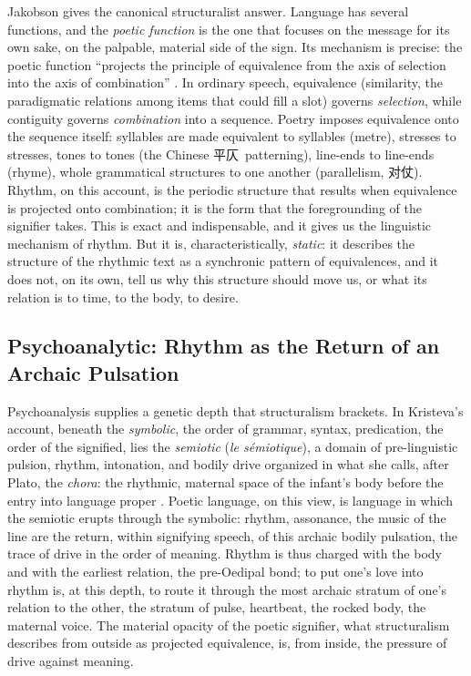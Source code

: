 Jakobson gives the canonical structuralist answer. Language has several functions, and the \emph{poetic function} is the one that focuses on the message for its own sake, on the palpable, material side of the sign. Its mechanism is precise: the poetic function ``projects the principle of equivalence from the axis of selection into the axis of combination'' \parencite{jakobson1960linguistics}. In ordinary speech, equivalence (similarity, the paradigmatic relations among items that could fill a slot) governs \emph{selection}, while contiguity governs \emph{combination} into a sequence. Poetry imposes equivalence onto the sequence itself: syllables are made equivalent to syllables (metre), stresses to stresses, tones to tones (the Chinese \cjkfont 平仄\normalfont\ patterning), line-ends to line-ends (rhyme), whole grammatical structures to one another (parallelism, \cjkfont 对仗\normalfont). Rhythm, on this account, is the periodic structure that results when equivalence is projected onto combination; it is the form that the foregrounding of the signifier takes. This is exact and indispensable, and it gives us the linguistic mechanism of rhythm. But it is, characteristically, \emph{static}: it describes the structure of the rhythmic text as a synchronic pattern of equivalences, and it does not, on its own, tell us why this structure should move us, or what its relation is to time, to the body, to desire.

\subsection{Psychoanalytic: Rhythm as the Return of an Archaic Pulsation}

Psychoanalysis supplies a genetic depth that structuralism brackets. In Kristeva's account, beneath the \emph{symbolic}, the order of grammar, syntax, predication, the order of the signified, lies the \emph{semiotic} (\textit{le sémiotique}), a domain of pre-linguistic pulsion, rhythm, intonation, and bodily drive organized in what she calls, after Plato, the \textit{chora}: the rhythmic, maternal space of the infant's body before the entry into language proper \parencite{kristeva1984revolution}. Poetic language, on this view, is language in which the semiotic erupts through the symbolic: rhythm, assonance, the music of the line are the return, within signifying speech, of this archaic bodily pulsation, the trace of drive in the order of meaning. Rhythm is thus charged with the body and with the earliest relation, the pre-Oedipal bond; to put one's love into rhythm is, at this depth, to route it through the most archaic stratum of one's relation to the other, the stratum of pulse, heartbeat, the rocked body, the maternal voice. The material opacity of the poetic signifier, what structuralism describes from outside as projected equivalence, is, from inside, the pressure of drive against meaning.


